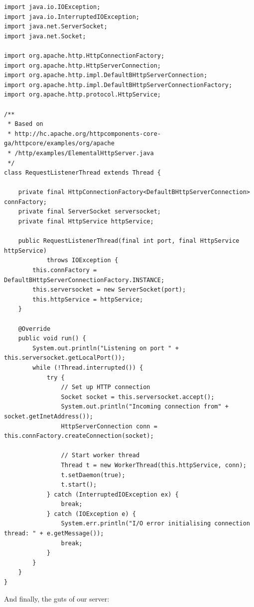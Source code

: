 \begin{lstlisting}
import java.io.IOException;
import java.io.InterruptedIOException;
import java.net.ServerSocket;
import java.net.Socket;

import org.apache.http.HttpConnectionFactory;
import org.apache.http.HttpServerConnection;
import org.apache.http.impl.DefaultBHttpServerConnection;
import org.apache.http.impl.DefaultBHttpServerConnectionFactory;
import org.apache.http.protocol.HttpService;

/**
 * Based on
 * http://hc.apache.org/httpcomponents-core-ga/httpcore/examples/org/apache
 * /http/examples/ElementalHttpServer.java
 */
class RequestListenerThread extends Thread {

	private final HttpConnectionFactory<DefaultBHttpServerConnection> connFactory;
	private final ServerSocket serversocket;
	private final HttpService httpService;

	public RequestListenerThread(final int port, final HttpService httpService)
			throws IOException {
		this.connFactory = DefaultBHttpServerConnectionFactory.INSTANCE;
		this.serversocket = new ServerSocket(port);
		this.httpService = httpService;
	}

	@Override
	public void run() {
		System.out.println("Listening on port " + this.serversocket.getLocalPort());
		while (!Thread.interrupted()) {
			try {
				// Set up HTTP connection
				Socket socket = this.serversocket.accept();
				System.out.println("Incoming connection from" + socket.getInetAddress());
				HttpServerConnection conn = this.connFactory.createConnection(socket);

				// Start worker thread
				Thread t = new WorkerThread(this.httpService, conn);
				t.setDaemon(true);
				t.start();
			} catch (InterruptedIOException ex) {
				break;
			} catch (IOException e) {
				System.err.println("I/O error initialising connection thread: " + e.getMessage());
				break;
			}
		}
	}
}
\end{lstlisting}

\newpage
\noindent
And finally, the guts of our server:

